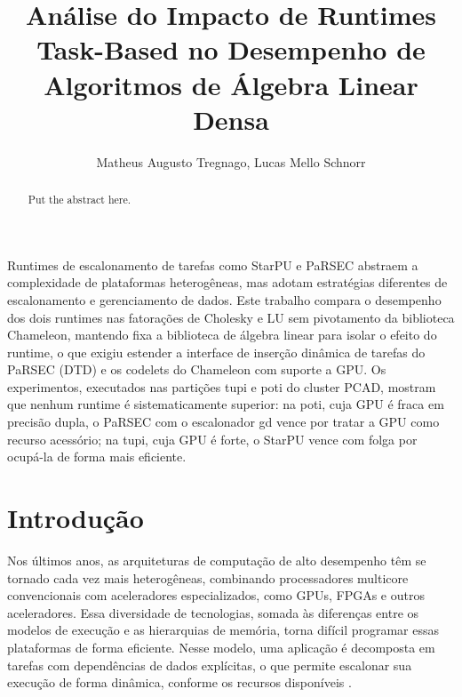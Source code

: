 \documentclass[12pt]{article}
\date{}
\title{Análise do Impacto de Runtimes Task-Based no Desempenho de Algoritmos de Álgebra Linear Densa}
\begin{document}
\makeatletter
\let\orgtitle\@title
\makeatother

\title{\orgtitle}

\author{
   Matheus Augusto Tregnago,
   Lucas Mello Schnorr
}

\address{
   Institute of Informatics, Federal University of Rio Grande do Sul (UFRGS)\\
   Caixa Postal 15.064 -- 91.501-970 -- Porto Alegre -- RS -- Brazil
   \nextinstitute
   Somebody else's Institution,
   Adress --  Brazil
}

\maketitle
\begin{abstract}
Put the abstract here.
\end{abstract}

\begin{resumo}
Runtimes de escalonamento de tarefas como StarPU e PaRSEC abstraem a complexidade de plataformas heterogêneas, mas adotam estratégias diferentes de escalonamento e gerenciamento de dados. Este trabalho compara o desempenho dos dois runtimes nas fatorações de Cholesky e LU sem pivotamento da biblioteca Chameleon, mantendo fixa a biblioteca de álgebra linear para isolar o efeito do runtime, o que exigiu estender a interface de inserção dinâmica de tarefas do PaRSEC (DTD) e os codelets do Chameleon com suporte a GPU. Os experimentos, executados nas partições tupi e poti do cluster PCAD, mostram que nenhum runtime é sistematicamente superior: na poti, cuja GPU é fraca em precisão dupla, o PaRSEC com o escalonador gd vence por tratar a GPU como recurso acessório; na tupi, cuja GPU é forte, o StarPU vence com folga por ocupá-la de forma mais eficiente.
\end{resumo}
\section{Introdução}
\label{sec:orgdd8df26}

Nos últimos anos, as arquiteturas de computação de alto desempenho têm se tornado cada vez mais heterogêneas, combinando processadores multicore convencionais com aceleradores especializados, como GPUs, FPGAs e outros aceleradores. Essa diversidade de tecnologias, somada às diferenças entre os modelos de execução e as hierarquias de memória, torna difícil programar essas plataformas de forma eficiente. Nesse modelo, uma aplicação é decomposta em tarefas com dependências de dados explícitas, o que permite escalonar sua execução de forma dinâmica, conforme os recursos disponíveis \cite{10025520}.
\end{document}
